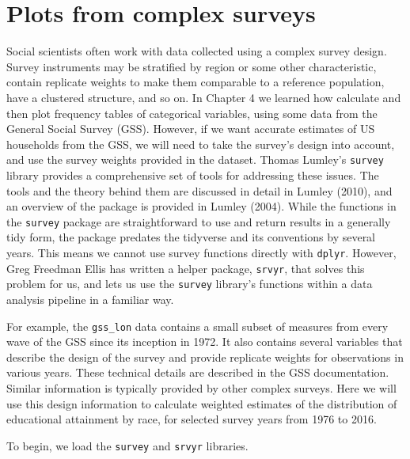 \documentclass[]{book}
\begin{document}
\hypertarget{plots-from-complex-surveys}{%
\section{Plots from complex surveys}\label{plots-from-complex-surveys}}

Social scientists often work with data collected using a complex survey design. Survey instruments may be stratified by region or some other characteristic, contain replicate weights to make them comparable to a reference population, have a clustered structure, and so on. In Chapter 4 we learned how calculate and then plot frequency tables of categorical variables, using some data from the General Social Survey (GSS). However, if we want accurate estimates of US households from the GSS, we will need to take the survey's design into account, and use the survey weights provided in the dataset. Thomas Lumley's \texttt{survey} library provides a comprehensive set of tools for addressing these issues. The tools and the theory behind them are discussed in detail in Lumley (2010), and an overview of the package is provided in Lumley (2004). While the functions in the \texttt{survey} package are straightforward to use and return results in a generally tidy form, the package predates the tidyverse and its conventions by several years. This means we cannot use survey functions directly with \texttt{dplyr}. However, Greg Freedman Ellis has written a helper package, \texttt{srvyr}, that solves this problem for us, and lets us use the \texttt{survey} library's functions within a data analysis pipeline in a familiar way.

For example, the \texttt{gss\_lon} data contains a small subset of measures from every wave of the GSS since its inception in 1972. It also contains several variables that describe the design of the survey and provide replicate weights for observations in various years. These technical details are described in the GSS documentation. Similar information is typically provided by other complex surveys. Here we will use this design information to calculate weighted estimates of the distribution of educational attainment by race, for selected survey years from 1976 to 2016.

To begin, we load the \texttt{survey} and \texttt{srvyr} libraries.\\
\end{document}
